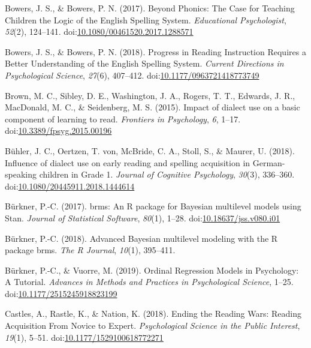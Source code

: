 \documentclass[doc,floatsintext]{apa6}
\begin{document}
\hypertarget{ref-Bowers2017}{}
Bowers, J. S., \& Bowers, P. N. (2017). Beyond Phonics: The Case for
Teaching Children the Logic of the English Spelling System.
\emph{Educational Psychologist}, \emph{52}(2), 124--141.
doi:\href{https://doi.org/10.1080/00461520.2017.1288571}{10.1080/00461520.2017.1288571}

\hypertarget{ref-Bowers2018}{}
Bowers, J. S., \& Bowers, P. N. (2018). Progress in Reading Instruction
Requires a Better Understanding of the English Spelling System.
\emph{Current Directions in Psychological Science}, \emph{27}(6),
407--412.
doi:\href{https://doi.org/10.1177/0963721418773749}{10.1177/0963721418773749}

\hypertarget{ref-Brown2015}{}
Brown, M. C., Sibley, D. E., Washington, J. A., Rogers, T. T., Edwards,
J. R., MacDonald, M. C., \& Seidenberg, M. S. (2015). Impact of dialect
use on a basic component of learning to read. \emph{Frontiers in
Psychology}, \emph{6}, 1--17.
doi:\href{https://doi.org/10.3389/fpsyg.2015.00196}{10.3389/fpsyg.2015.00196}

\hypertarget{ref-Buhler2018}{}
Bühler, J. C., Oertzen, T. von, McBride, C. A., Stoll, S., \& Maurer, U.
(2018). Influence of dialect use on early reading and spelling
acquisition in German-speaking children in Grade 1. \emph{Journal of
Cognitive Psychology}, \emph{30}(3), 336--360.
doi:\href{https://doi.org/10.1080/20445911.2018.1444614}{10.1080/20445911.2018.1444614}

\hypertarget{ref-R-brms_a}{}
Bürkner, P.-C. (2017). brms: An R package for Bayesian multilevel models
using Stan. \emph{Journal of Statistical Software}, \emph{80}(1), 1--28.
doi:\href{https://doi.org/10.18637/jss.v080.i01}{10.18637/jss.v080.i01}

\hypertarget{ref-R-brms_b}{}
Bürkner, P.-C. (2018). Advanced Bayesian multilevel modeling with the R
package brms. \emph{The R Journal}, \emph{10}(1), 395--411.

\hypertarget{ref-Burkner2019}{}
Bürkner, P.-C., \& Vuorre, M. (2019). Ordinal Regression Models in
Psychology: A Tutorial. \emph{Advances in Methods and Practices in
Psychological Science}, 1--25.
doi:\href{https://doi.org/10.1177/2515245918823199}{10.1177/2515245918823199}

\hypertarget{ref-Castles2018}{}
Castles, A., Rastle, K., \& Nation, K. (2018). Ending the Reading Wars:
Reading Acquisition From Novice to Expert. \emph{Psychological Science
in the Public Interest}, \emph{19}(1), 5--51.
doi:\href{https://doi.org/10.1177/1529100618772271}{10.1177/1529100618772271}
\end{document}
